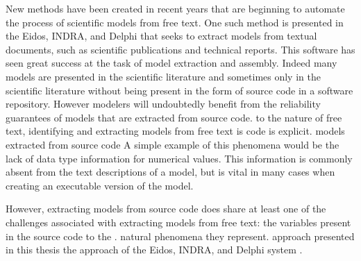 New methods have been created in recent years that are beginning to automate the process of  %
scientific models from free text. One such method is presented in the Eidos, INDRA, and Delphi \citep{EidosIndraDelphi}  %
that seeks to extract models from textual documents, such as scientific publications and technical reports. This software has seen great success at the task of model extraction and assembly. Indeed many models are presented in the scientific literature and sometimes only in the scientific literature without being present in the form of source code in a software repository. However modelers will undoubtedly benefit from the reliability guarantees of models that are extracted from source code.
 to the nature of free text, identifying and extracting models from free text is
 code  is explicit.
models extracted from source code  %
A simple example of this phenomena would be the lack of data type information for numerical values. This information is commonly absent from the text descriptions of a model, but is vital in many cases when creating an executable version of the model.

However, extracting models from source code does share at least one of the challenges associated with extracting models from free text:
 the variables present in the source code to the .
natural phenomena they represent.
 approach presented in this thesis
 the approach of the Eidos, INDRA, and Delphi system .

